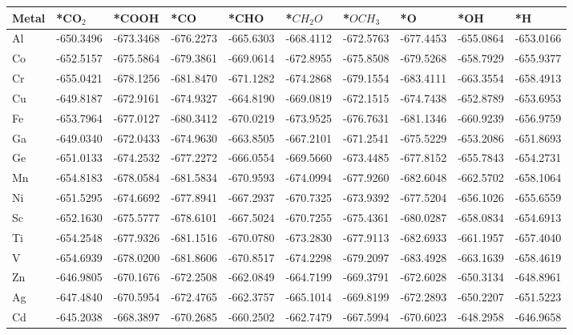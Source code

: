 \begin{table}[h]
  \centering
  {\fontsize{6}{12}\selectfont
  \begin{tabular}{*{10}{l}}
    \hline
    Metal & *CO$_2$ & *COOH & *CO & *CHO & *$CH_2O$ & *$OCH_3$ & *O & *OH & *H \\
    \hline
    Al & -650.3496 & -673.3468 & -676.2273 & -665.6303 & -668.4112 & -672.5763 & -677.4453 & -655.0864 & -653.0166 \\
    Co & -652.5157 & -675.5864 & -679.3861 & -669.0614 & -672.8955 & -675.8508 & -679.5268 & -658.7929 & -655.9377 \\
    Cr & -655.0421 & -678.1256 & -681.8470 & -671.1282 & -674.2868 & -679.1554 & -683.4111 & -663.3554 & -658.4913 \\
    Cu & -649.8187 & -672.9161 & -674.9327 & -664.8190 & -669.0819 & -672.1515 & -674.7438 & -652.8789 & -653.6953 \\
    Fe & -653.7964 & -677.0127 & -680.3412 & -670.0219 & -673.9525 & -676.7631 & -681.1346 & -660.9239 & -656.9759 \\
    Ga & -649.0340 & -672.0433 & -674.9630 & -663.8505 & -667.2101 & -671.2541 & -675.5229 & -653.2086 & -651.8693 \\
    Ge & -651.0133 & -674.2532 & -677.2272 & -666.0554 & -669.5660 & -673.4485 & -677.8152 & -655.7843 & -654.2731 \\
    Mn & -654.8183 & -678.0584 & -681.5834 & -670.9593 & -674.0994 & -677.9260 & -682.6048 & -662.5702 & -658.1064 \\
    Ni & -651.5295 & -674.6692 & -677.8941 & -667.2937 & -670.7325 & -673.9392 & -677.5204 & -656.1026 & -655.6559 \\
    Sc & -652.1630 & -675.5777 & -678.6101 & -667.5024 & -670.7255 & -675.4361 & -680.0287 & -658.0834 & -654.6913 \\
    Ti & -654.2548 & -677.9326 & -681.1516 & -670.0780 & -673.2830 & -677.9113 & -682.6933 & -661.1957 & -657.4040 \\
    V  & -654.6939 & -678.0200 & -681.8606 & -670.8517 & -674.2298 & -679.2097 & -683.4928 & -663.1639 & -658.4619 \\
    Zn & -646.9805 & -670.1676 & -672.2508 & -662.0849 & -664.7199 & -669.3791 & -672.6028 & -650.3134 & -648.8961 \\
    Ag & -647.4840 & -670.5954 & -672.4765 & -662.3757 & -665.1014 & -669.8199 & -672.2893 & -650.2207 & -651.5223 \\
    Cd & -645.2038 & -668.3897 & -670.2685 & -660.2502 & -662.7479 & -667.5994 & -670.6023 & -648.2958 & -646.9658 \\

\end{tabular}}
\end{table}

